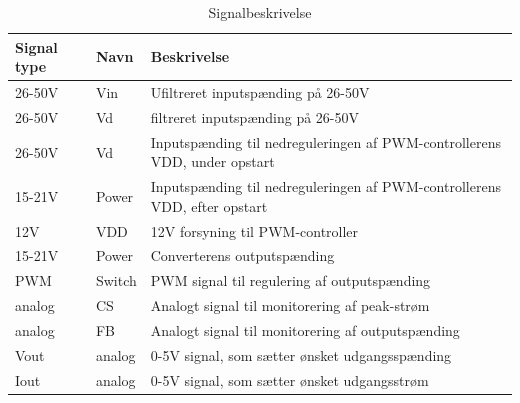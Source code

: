 \begin{table}[htbp]
	\centering
	\begin{tabular}{|l|l|l|}
		\hline
		\textbf{Signal type} 	&\textbf{Navn}		&\textbf{Beskrivelse} \\\hline
		26-50V			&Vin		&Ufiltreret inputspænding på 26-50V\\\hline
		26-50V			&Vd			&filtreret inputspænding på 26-50V\\\hline
		26-50V			&Vd			&Inputspænding til nedreguleringen af PWM-controllerens VDD, under opstart\\\hline
		15-21V			&Power		&Inputspænding til nedreguleringen af PWM-controllerens VDD, efter opstart\\\hline
		12V				&VDD		&12V forsyning til PWM-controller\\\hline
		15-21V			&Power		&Converterens outputspænding\\\hline
		PWM				&Switch		&PWM signal til regulering af outputspænding\\\hline
		analog			&CS			&Analogt signal til monitorering af peak-strøm   \\\hline	
		analog			&FB			&Analogt signal til monitorering af outputspænding\\\hline
		Vout			&analog		&0-5V signal, som sætter ønsket udgangsspænding\\\hline
		Iout			&analog		&0-5V signal, som sætter ønsket udgangsstrøm\\\hline
		
	\end{tabular}
	\caption{Signalbeskrivelse}
	\label{tabel: Signalbeskrivelse}
\end{table}

